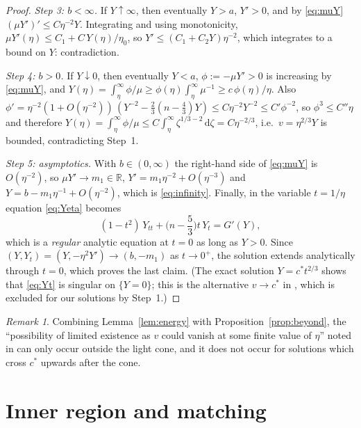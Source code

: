 \documentclass[11pt,a4paper]{amsart}
\theoremstyle{definition}
\theoremstyle{remark}
\newtheorem{remark}[theorem]{Remark}
\newcommand{\R}{\mathbb{R}}
\newcommand{\cstar}{c^{*}}
\newcommand{\dd}{\,\mathrm{d}}
\begin{document}
\begin{proof}
\emph{Step 3: $b<\infty$.}  If $Y\uparrow\infty$, then eventually $Y>a$, $Y'>0$, and by \eqref{eq:muY} $(\mu Y')'\le C\eta^{-2}Y$.  Integrating and using monotonicity, $\mu Y'(\eta)\le C_1+C\,Y(\eta)/\eta_0$, so $Y'\le(C_1+C_2Y)\eta^{-2}$, which integrates to a bound on $Y$: contradiction.

\emph{Step 4: $b>0$.}  If $Y\downarrow0$, then eventually $Y<a$, $\phi:=-\mu Y'>0$ is increasing by \eqref{eq:muY}, and
$Y(\eta)=\int_\eta^\infty\phi/\mu\ge\phi(\eta)\int_\eta^\infty\mu^{-1}\ge c\,\phi(\eta)/\eta$.
Also $\phi'=\eta^{-2}(1+O(\eta^{-2}))\,(Y^{-2}-\tfrac23(n-\tfrac43)Y)\le C\eta^{-2}Y^{-2}\le C'\phi^{-2}$, so $\phi^3\le C''\eta$ and therefore $Y(\eta)=\int_\eta^\infty\phi/\mu\le C\int_\eta^\infty\zeta^{1/3-2}\dd\zeta=C\eta^{-2/3}$, i.e.\ $v=\eta^{2/3}Y$ is bounded, contradicting Step~1.

\emph{Step 5: asymptotics.}  With $b\in(0,\infty)$ the right-hand side of \eqref{eq:muY} is $O(\eta^{-2})$, so $\mu Y'\to m_1\in\R$, $Y'=m_1\eta^{-2}+O(\eta^{-3})$ and $Y=b-m_1\eta^{-1}+O(\eta^{-2})$, which is \eqref{eq:infinity}.  Finally, in the variable $t=1/\eta$ equation \eqref{eq:Yeta} becomes
\begin{equation}\label{eq:Yt}
(1-t^2)\,Y_{tt}+\Big(n-\frac53\Big)t\,Y_t=G'(Y),
\end{equation}
which is a \emph{regular} analytic equation at $t=0$ as long as $Y>0$.  Since $(Y,Y_t)=(Y,-\eta^2Y')\to(b,-m_1)$ as $t\to0^+$, the solution extends analytically through $t=0$, which proves the last claim.  (The exact solution $Y=\cstar t^{2/3}$ shows that \eqref{eq:Yt} is singular on $\{Y=0\}$; this is the alternative $v\to\cstar$ in \cite[Lemma 2.4]{GHL22}, which is excluded for our solutions by Step~1.)
\end{proof}

\begin{remark}
Combining Lemma~\ref{lem:energy} with Proposition~\ref{prop:beyond}, the ``possibility of limited existence as $v$ could vanish at some finite value of $\eta$'' noted in \cite{GHL22} can only occur outside the light cone, and it does not occur for solutions which cross $\cstar$ upwards after the cone.
\end{remark}

\section{Inner region and matching}\label{sec:matching}
\end{document}
